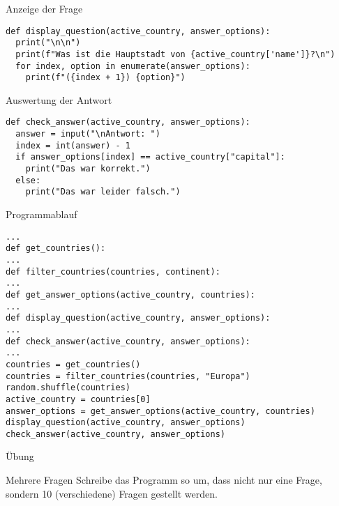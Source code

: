 \begin{fragile}
\begin{block}{Anzeige der Frage}
\vspace{2pt}
\begin{verbatim}
def display_question(active_country, answer_options):
  print("\n\n")
  print(f"Was ist die Hauptstadt von {active_country['name']}?\n")
  for index, option in enumerate(answer_options):
    print(f"({index + 1}) {option}")
\end{verbatim}
\end{block}

\vspace{12pt}
\pause 

\begin{block}{Auswertung der Antwort}
	\vspace{2pt}
	\begin{verbatim}
def check_answer(active_country, answer_options):
  answer = input("\nAntwort: ")
  index = int(answer) - 1
  if answer_options[index] == active_country["capital"]:
    print("Das war korrekt.")
  else:
    print("Das war leider falsch.")
\end{verbatim}
\end{block}

\end{fragile}


\begin{fragile}
\begin{block}{Programmablauf}
\vspace{2pt}
\begin{verbatim}
...	
def get_countries():
...
def filter_countries(countries, continent):
...
def get_answer_options(active_country, countries):
...
def display_question(active_country, answer_options):
...
def check_answer(active_country, answer_options):
...
countries = get_countries()
countries = filter_countries(countries, "Europa")
random.shuffle(countries)
active_country = countries[0]
answer_options = get_answer_options(active_country, countries)
display_question(active_country, answer_options)
check_answer(active_country, answer_options)	
\end{verbatim}
\end{block}
\end{fragile}


\begin{frame}{Übung}
\begin{block}{Mehrere Fragen}
\vspace{2pt}
Schreibe das Programm so um, dass nicht nur eine Frage, sondern 10 (verschiedene) Fragen gestellt werden. 
\end{block}
\end{frame}



